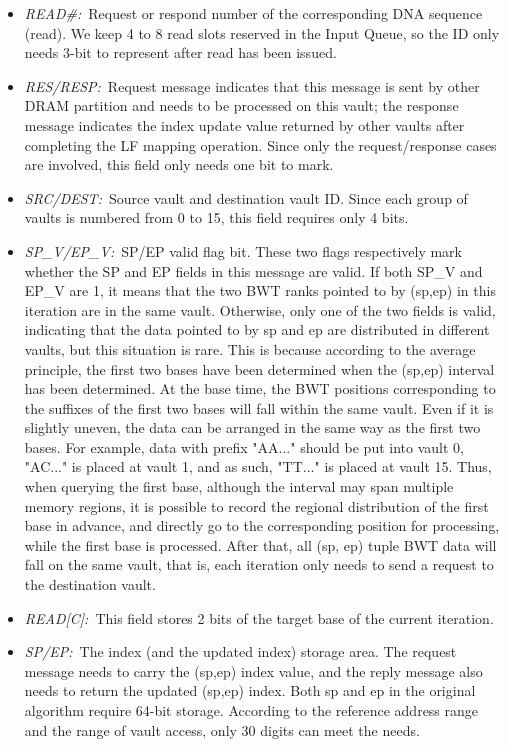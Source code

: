 \documentclass[9pt,conference]{IEEEtran}
\begin{document}
\begin{itemize}
    \item \textit{READ\#:}~Request or respond number of the corresponding DNA sequence (read). We keep 4 to 8 read slots reserved in the Input Queue, so the ID only needs 3-bit to represent after read has been issued.
    
    \item \textit{RES/RESP:}~Request message indicates that this message is sent by other DRAM partition and needs to be processed on this vault; the response message indicates the index update value returned by other vaults after completing the LF mapping operation. Since only the request/response cases are involved, this field only needs one bit to mark.
    
    \item \textit{SRC/DEST:}~Source vault and destination vault ID. Since each group of vaults is numbered from 0 to 15, this field requires only 4 bits.
    
    \item \textit{SP\_V/EP\_V:}~SP/EP valid flag bit. These two flags respectively mark whether the SP and EP fields in this message are valid. If both SP\_V and EP\_V are 1, it means that the two BWT ranks pointed to by (sp,ep) in this iteration are in the same vault. Otherwise, only one of the two fields is valid, indicating that the data pointed to by sp and ep are distributed in different vaults, but this situation is rare. This is because according to the average principle, the first two bases have been determined when the (sp,ep) interval has been determined. At the base time, the BWT positions corresponding to the suffixes of the first two bases will fall within the same vault. Even if it is slightly uneven, the data can be arranged in the same way as the first two bases. For example, data with prefix "AA..." should be put into vault 0, "AC..." is placed at vault 1, and as such, "TT..." is placed at vault 15. Thus, when querying the first base, although the interval may span multiple memory regions, it is possible to record the regional distribution of the first base in advance, and directly go to the corresponding position for processing, while the first base is processed. After that, all (sp, ep) tuple BWT data will fall on the same vault, that is, each iteration only needs to send a request to the destination vault.
    
    \item \textit{READ[C]:}~This field stores 2 bits of the target base of the current iteration.
    
    \item \textit{SP/EP:}~The index (and the updated index) storage area. The request message needs to carry the (sp,ep) index value, and the reply message also needs to return the updated (sp,ep) index. Both sp and ep in the original algorithm require 64-bit storage. According to the reference address range and the range of vault access, only 30 digits can meet the needs.
    
\end{itemize}
\end{document}
